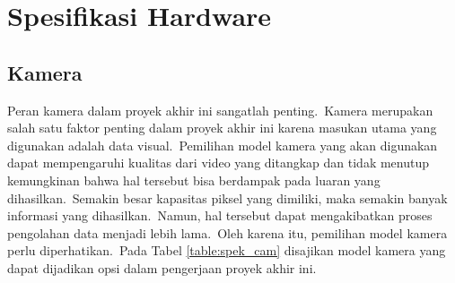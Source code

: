 \section{Spesifikasi Hardware}
\subsection{Kamera}
Peran kamera dalam proyek akhir ini sangatlah penting.~Kamera merupakan salah satu faktor penting dalam proyek akhir ini karena masukan utama yang digunakan adalah data visual.~Pemilihan model kamera yang akan digunakan dapat mempengaruhi kualitas dari video yang ditangkap dan tidak menutup kemungkinan bahwa hal tersebut bisa berdampak pada luaran yang dihasilkan.~Semakin besar kapasitas piksel yang dimiliki, maka semakin banyak informasi yang dihasilkan.~Namun, hal tersebut dapat mengakibatkan proses pengolahan data menjadi lebih lama.~Oleh karena itu, pemilihan model kamera perlu diperhatikan.~Pada Tabel \ref{table:spek_cam} disajikan model kamera yang dapat dijadikan opsi dalam pengerjaan proyek akhir ini.

